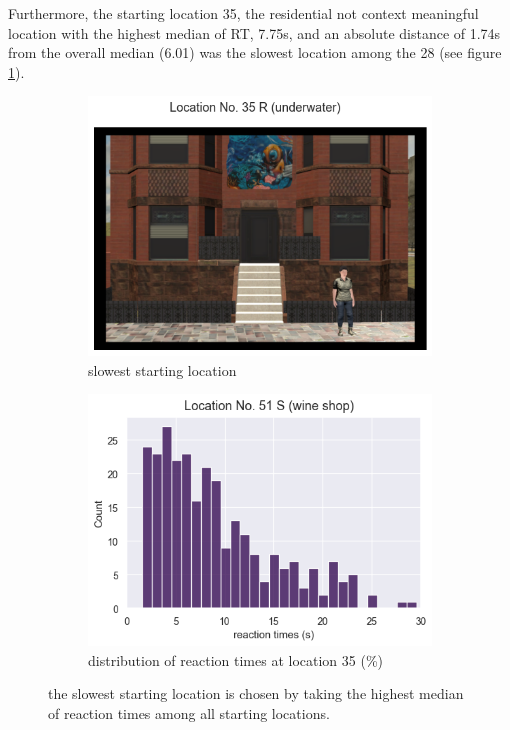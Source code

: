 Furthermore, the starting location 35, the residential not context meaningful location with the highest median of RT, 7.75s, and an absolute distance of 1.74s from the overall median (6.01) was the slowest location among the 28 (see figure \ref{fig:slowest_loc}). 

\begin{figure}[!htb]
	\begin{subfigure}[b]{0.48\linewidth}
		\includegraphics[width=\linewidth]{figures/worst_loc_angular_error__withHA_23.png}
		\caption{slowest starting location}
		\label{fig:slowest_loc}
	\end{subfigure}
	\begin{subfigure}[b]{0.48\linewidth}
		\includegraphics[width=\linewidth]{figures/slowest_loc_RT_dist_35_23.png}
		\caption{distribution of reaction times at location 35 (\%)}
		\label{fig:best_angular_dist_35}
	\end{subfigure}
	
	\caption[Slowest starting location]{the slowest starting location is chosen by taking the highest median of reaction times among all starting locations.}
\end{figure}
\label{fig:slowest_location}

